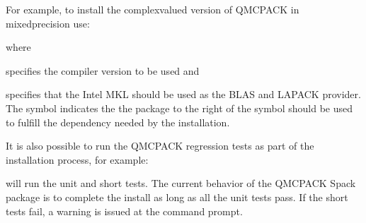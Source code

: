 \documentclass[letterpaper,10pt,english]{sphinxmanual}
\begin{document}
For example, to install the complex\sphinxhyphen{}valued version of QMCPACK in mixed\sphinxhyphen{}precision use:

\begin{sphinxVerbatim}[commandchars=\\\{\}]
    
\end{sphinxVerbatim}

where

\begin{sphinxVerbatim}[commandchars=\\\{\}]
\end{sphinxVerbatim}

specifies the compiler version to be used and

\begin{sphinxVerbatim}[commandchars=\\\{\}]
\end{sphinxVerbatim}

specifies that the Intel MKL should be used as the BLAS and LAPACK
provider. The \sphinxcode{\sphinxupquote{\textasciicircum{}}} symbol indicates the the package to the right of the
symbol should be used to fulfill the dependency needed by the installation.

It is also possible to run the QMCPACK regression tests as part of the
installation process, for example:

\begin{sphinxVerbatim}[commandchars=\\\{\}]
     
\end{sphinxVerbatim}

will run the unit and short tests. The current behavior of the QMCPACK
Spack package is to complete the install as long as all the unit tests
pass. If the short tests fail, a warning is issued at the command prompt.
\end{document}
